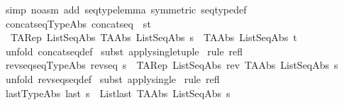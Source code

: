 \begin{isabellebody}
\isamarkupfalse%
\ {\isacharparenleft}simp\ {\isacharparenleft}no{\isacharunderscore}asm{\isacharparenright}\ add{\isacharcolon}\ seqtype{\isacharunderscore}lemma\ {\isacharbrackleft}symmetric{\isacharbrackright}\ seqtype{\isacharunderscore}def{\isacharparenright}\isanewline
{}\isamarkupfalse%
%
\endisatagproof
{\isafoldproof}%
%
\isadelimproof
\isanewline
%
\endisadelimproof
\isanewline
\isanewline
\isanewline
\isanewline
\isanewline
\isanewline
\isanewline
{}\isamarkupfalse%
\ concatseq{\isacharunderscore}TypeAbs{\isacharcolon}\ {\isachardoublequoteopen}{\isacharparenleft}concatseq\ {\isacharpercent}{\isacharcircum}\ {\isacharparenleft}s{\isacharcomma}t{\isacharparenright}{\isacharparenright}\ {\isacharequal}\ \ \isanewline
\ \ TARep\ ListSeqAbs\ {\isacharparenleft}{\isacharparenleft}TAAbs\ ListSeqAbs\ s{\isacharparenright}\ {\isacharat}\ {\isacharparenleft}TAAbs\ ListSeqAbs\ t{\isacharparenright}{\isacharparenright}{\isachardoublequoteclose}\isanewline
%
\isadelimproof
%
\endisadelimproof
%
\isatagproof
{}\isamarkupfalse%
\ {\isacharparenleft}unfold\ concatseq{\isacharunderscore}def{\isacharparenright}\isanewline
{}\isamarkupfalse%
\ {\isacharparenleft}subst\ apply{\isacharunderscore}single{\isacharunderscore}tuple{\isacharparenright}\isanewline
{}\isamarkupfalse%
\ {\isacharparenleft}rule\ refl{\isacharparenright}\isanewline
{}\isamarkupfalse%
%
\endisatagproof
{\isafoldproof}%
%
\isadelimproof
\isanewline
%
\endisadelimproof
\isanewline
{}\isamarkupfalse%
\ revseqseq{\isacharunderscore}TypeAbs{\isacharcolon}\ {\isachardoublequoteopen}{\isacharparenleft}revseq\ s{\isacharparenright}\ {\isacharequal}\ {\isacharparenleft}TARep\ ListSeqAbs\ {\isacharparenleft}rev\ {\isacharparenleft}TAAbs\ ListSeqAbs\ s{\isacharparenright}{\isacharparenright}{\isacharparenright}{\isachardoublequoteclose}\isanewline
%
\isadelimproof
%
\endisadelimproof
%
\isatagproof
{}\isamarkupfalse%
\ {\isacharparenleft}unfold\ revseqseq{\isacharunderscore}def{\isacharparenright}\isanewline
{}\isamarkupfalse%
\ {\isacharparenleft}subst\ apply{\isacharunderscore}single{\isacharparenright}\isanewline
{}\isamarkupfalse%
\ {\isacharparenleft}rule\ refl{\isacharparenright}\isanewline
{}\isamarkupfalse%
%
\endisatagproof
{\isafoldproof}%
%
\isadelimproof
\isanewline
%
\endisadelimproof
\isanewline
\isanewline
{}\isamarkupfalse%
\ last{\isacharunderscore}TypeAbs{\isacharcolon}\ {\isachardoublequoteopen}{\isacharparenleft}last\ s{\isacharparenright}\ {\isacharequal}\ {\isacharparenleft}List{\isachardot}last\ {\isacharparenleft}TAAbs\ ListSeqAbs\ s{\isacharparenright}{\isacharparenright}{\isachardoublequoteclose}\isanewline

\end{isabellebody}
